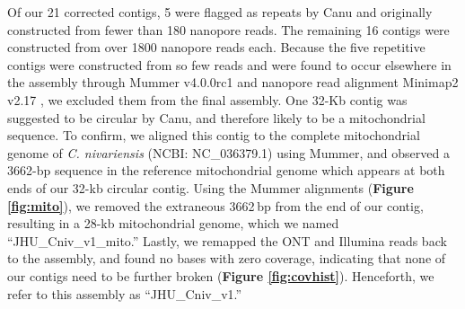 Of our 21 corrected contigs, 5 were flagged as repeats by Canu and originally constructed from fewer than 180 nanopore reads. The remaining 16 contigs were constructed from over 1800 nanopore reads each. Because the five repetitive contigs were constructed from so few reads and were found to occur elsewhere in the assembly through Mummer v4.0.0rc1 \citep{Marcais2018-mm} and nanopore read alignment Minimap2 v2.17 \citep{Li2018-eq}, we excluded them from the final assembly. One 32-Kb contig was suggested to be circular by Canu, and therefore likely to be a mitochondrial sequence. To confirm, we aligned this contig to the complete mitochondrial genome of \textit{C. nivariensis} (NCBI: NC\_036379.1) using Mummer, and observed a 3662-bp sequence in the reference mitochondrial genome which appears at both ends of our 32-kb circular contig. Using the Mummer alignments ({\bf Figure \ref{fig:mito}}), we removed the extraneous 3662 bp from the end of our contig, resulting in a 28-kb mitochondrial genome, which we named “JHU\_Cniv\_v1\_mito.” Lastly, we remapped the ONT and Illumina reads back to the assembly, and found no bases with zero coverage, indicating that none of our contigs need to be further broken ({\bf Figure \ref{fig:covhist}}). Henceforth, we refer to this assembly as “JHU\_Cniv\_v1.”

